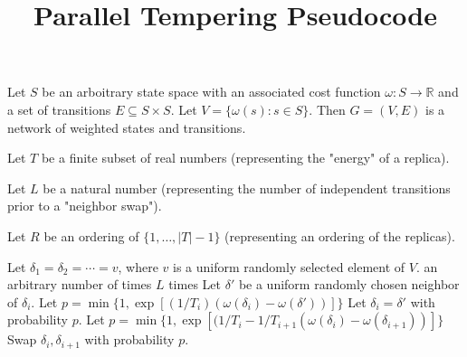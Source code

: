 \documentclass[11pt, oneside]{article}   	%
\title{Parallel Tempering Pseudocode}
\author{}
\date{}
\def\R{\mathbb R}
\begin{document}
\maketitle

Let $S$ be an arboitrary state space with an associated cost function $\omega\colon S\rightarrow\R$ and a set of transitions $E \subseteq S\times S$. Let $V = \{ \omega(s) \colon s\in S\}$. Then $G=(V,E)$ is a network of weighted states and transitions.

Let $T$ be a finite subset of real numbers (representing the "energy" of a replica).

Let $L$ be a natural number (representing the number of independent transitions prior to a "neighbor swap").

Let $R$ be an ordering of $\{ 1, \ldots, |T| - 1\}$ (representing an ordering of the replicas).

\vspace{1cm}

\begin{algorithmic}
\State Let $\delta_1 =  \delta_2 = \cdots = v$, where $v$ is a uniform randomly selected element of $V$.
\Loop \;an arbitrary number of times
		\Loop \;$L$ times
			\State Let $\delta'$ be a uniform randomly chosen neighbor of $\delta_i$.
			\State Let $p = \min\{1, \exp\left[ (1/T_i) (\omega(\delta_i) - \omega(\delta')) \right] \}$
			\State Let $\delta_i = \delta'$ with probability $p$.
		\EndLoop
	\EndFor
	\State
		\State Let $p = \min\{1, \exp\left[ (1/T_i -1/T_{i+1} (\omega(\delta_i) - \omega(\delta_{i+1})) \right] \}$
		\State Swap $\delta_i, \delta_{i+1}$ with probability $p$.
	\EndFor
\EndLoop
				
\end{algorithmic}
\end{document}

